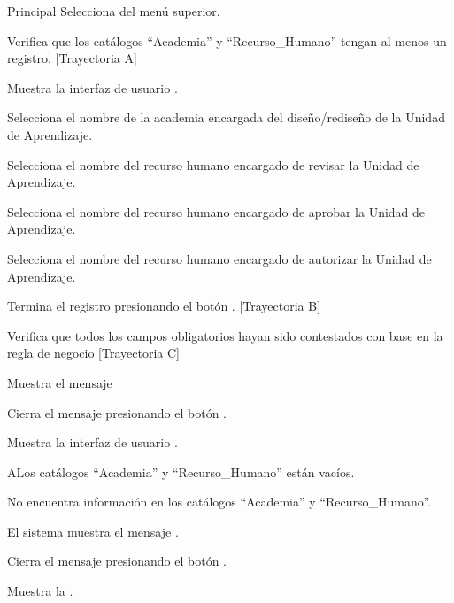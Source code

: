 \begin{UCtrayectoria}{Principal}
    \UCpaso[\UCactor] Selecciona  del menú superior.
    
    \UCpaso Verifica que los catálogos ``Academia'' y ``Recurso\_Humano'' tengan al menos un registro. [Trayectoria A]
    
    \UCpaso Muestra la interfaz de usuario .
    
    \UCpaso[\UCactor] Selecciona el nombre de la academia encargada del diseño/rediseño de la Unidad de Aprendizaje. 
    
    \UCpaso[\UCactor] Selecciona el nombre del recurso humano encargado de revisar la Unidad de Aprendizaje.
    
    \UCpaso[\UCactor] Selecciona el nombre del recurso humano encargado de aprobar la Unidad de Aprendizaje.
    
    \UCpaso[\UCactor] Selecciona el nombre del recurso humano encargado de autorizar la Unidad de Aprendizaje.
    
    \UCpaso[\UCactor] Termina el registro presionando el botón . [Trayectoria B]
    
    \UCactor Verifica que todos los campos obligatorios hayan sido contestados con base en la regla de negocio  [Trayectoria C]
    
    \UCpaso Muestra el mensaje 
    
    \UCpaso[\UCactor] Cierra el mensaje presionando el botón .
    
    \UCpaso Muestra la interfaz de usuario .
\end{UCtrayectoria}


\begin{UCtrayectoriaA}{A}{Los catálogos ``Academia'' y ``Recurso\_Humano'' están vacíos.}

    \UCpaso No encuentra información en los catálogos ``Academia'' y ``Recurso\_Humano''.
    
    \UCpaso El sistema muestra el mensaje .
    
    \UCpaso[\UCactor] Cierra el mensaje presionando el botón .
    
    \UCpaso Muestra la .
\end{UCtrayectoriaA}

